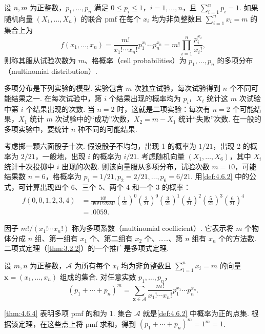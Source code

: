 \begin{definition}\label{def:4.6.2}
设 $n,m$ 为正整数，$p_1,\ldots,p_n$ 满足 $0\le p_i\le1$，$i=1,\ldots,n$，且 $\sum_{i=1}^np_i=1$. 如果随机向量 $(X_1,\ldots,X_n)$ 的联合 pmf 在每个 $x_i$ 均为非负整数且 $\sum_{i=1}^nx_i=m$ 的集合上为
$$f(x_1,\ldots,x_n)=\frac{m!}{x_1!\cdots x_n!}p_1^{x_1}\cdots p_n^{x_n}=m!\prod_{i=1}^n\frac{p_i^{x_i}}{x_i!},$$
则称其服从试验次数为 $m$、格概率（cell probabilities）为 $p_1,\ldots,p_n$ 的多项分布（multinomial distribution）.
\end{definition}
多项分布是下列实验的模型. 实验包含 $m$ 次独立试验，每次试验得到 $n$ 个不同可能结果之一. 在每次试验中，第 $i$ 个结果出现的概率均为 $p_i$，$X_i$ 统计这 $m$ 次试验中第 $i$ 个结果出现的次数. 当 $n=2$ 时，这就是二项实验：每次有 $n=2$ 个可能结果，$X_1$ 统计 $m$ 次试验中的“成功”次数，$X_2=m-X_1$ 统计“失败”次数. 在一般的多项实验中，要统计 $n$ 种不同的可能结果.
\begin{example}[多元 pmf]\label{ex:4.6.3}
考虑掷一颗六面骰子十次. 假设骰子不均匀，出现 1 的概率为 $1/21$，出现 2 的概率为 $2/21$，一般地，出现 $i$ 的概率为 $i/21$. 考虑随机向量 $(X_1,\ldots,X_6)$，其中 $X_i$ 统计十次投掷中 $i$ 出现的次数. 则该向量服从多项分布，试验次数 $m=10$，可能结果数 $n=6$，格概率为 $p_1=1/21,p_2=2/21,\ldots,p_6=6/21$. 用\autoref{def:4.6.2} 中的公式，可计算出现四个 6、三个 5、两个 4 和一个 3 的概率：
$$\begin{aligned}
f(0,0,1,2,3,4)&=\frac{10!}{0!0!1!2!3!4!}\left(\frac1{21}\right)^0\left(\frac2{21}\right)^0
\left(\frac3{21}\right)^1\left(\frac4{21}\right)^2\left(\frac5{21}\right)^3\left(\frac6{21}\right)^4\\
&=.0059.
\end{aligned}$$
\end{example}
因子 $m!/(x_1!\cdots x_n!)$ 称为多项系数（multinomial coefficient）. 它表示将 $m$ 个物体分成 $n$ 组、第一组有 $x_1$ 个、第二组有 $x_2$ 个、……、第 $n$ 组有 $x_n$ 个的方法数. 二项式定理（\autoref{thm:3.2.2}）的一个推广是多项式定理.
\begin{theorem}[多项式定理]\label{thm:4.6.4}
设 $m,n$ 为正整数，$\mathscr A$ 为所有每个 $x_i$ 均为非负整数且 $\sum_{i=1}^nx_i=m$ 的向量 $\mathbf x=(x_1,\ldots,x_n)$ 组成的集合. 对任意实数 $p_1,\ldots,p_n$，
$$(p_1+\cdots+p_n)^m=\sum_{\mathbf x\in\mathscr A}\frac{m!}{x_1!\cdots x_n!}p_1^{x_1}\cdots p_n^{x_n}.$$
\end{theorem}
\autoref{thm:4.6.4} 表明多项 pmf 的和为 1. 集合 $\mathscr A$ 就是\autoref{def:4.6.2} 中概率为正的点集. 根据该定理，在这些点上将 pmf 求和，得到 $(p_1+\cdots+p_n)^m=1^m=1$.

